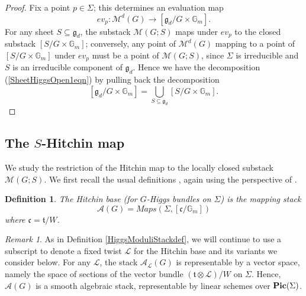 \documentclass{amsart}
\newtheorem{definition}[theorem]{Definition}
\theoremstyle{remark}
\newtheorem{remark}[theorem]{Remark}
\numberwithin{theorem}{section}
\numberwithin{equation}{section}
\begin{document}
\begin{proof}
Fix a point $p \in \Sigma$; this determines an evaluation map $$ev_p:\mathcal M^{d}(G) \rightarrow [\mathfrak{g}_d/G\times \mathbb{G}_m].$$ For any sheet $S \subseteq \mathfrak{g}_d$, the substack $\mathcal M(G;S)$ maps under $ev_p$ to the closed substack $[S/G \times \mathbb{G}_m]$; conversely, any point of $\mathcal M^{d}(G)$ mapping to a point of $[S/G\times\mathbb{G}_m]$ under $ev_p$ must be a point of $\mathcal M(G;S)$, since $\Sigma$ is irreducible and $S$ is an irreducible component of $\mathfrak{g}_d$. Hence we have the decomposition (\ref{SheetHiggsOpen1eqn}) by pulling back the decomposition
\begin{equation}\label{SheetHiggsOpen3eqn}
      [\mathfrak{g}_d/G\times\mathbb{G}_m] = \bigcup_{S \subseteq \mathfrak{g}_d} [S/G\times \mathbb{G}_m].
\end{equation}
\end{proof}

\subsection{The \texorpdfstring{$S$}{S}-Hitchin map}\label{SHitchinsbn}
 We study the restriction of the Hitchin map to the locally closed substack $\mathcal M(G;S)$. We first recall the usual definitions \cite{Hitchin2}, again using the perspective of \cite{Ngo1}.

\begin{definition}\label{HitchinBasedef}
    The \emph{Hitchin base} (for $G$-Higgs bundles on $\Sigma$) is the mapping stack
    \begin{equation}\label{HitchinBase1eqn}
        \mathcal A(G) = Maps(\Sigma,[\mathfrak{c}/\mathbb{G}_m])
    \end{equation}
    where $\mathfrak{c} = \mathfrak{t}/W$.
\end{definition}

\begin{remark}\label{HitchinBasermk}
    As in Definition \ref{HiggsModuliStackdef}, we will continue to use a subscript to denote a fixed twist $\mathcal L$ for the Hitchin base and its variants we consider below. For any $\mathcal L$, the stack $\mathcal A_{\mathcal L}(G)$ is representable by a vector space, namely the space of sections of the vector bundle $(\mathfrak{t} \otimes \mathcal L)/W$ on $\Sigma$. Hence, $\mathcal A(G)$ is a smooth algebraic stack, representable by linear schemes over ${\bf Pic}(\Sigma)$.
\end{remark}
\end{document}
